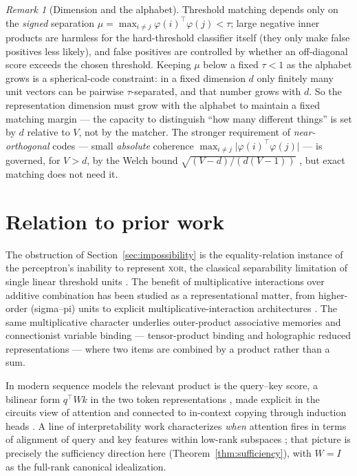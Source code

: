 \documentclass[11pt]{article}
\theoremstyle{plain}
\theoremstyle{definition}
\theoremstyle{remark}
\newtheorem{remark}{Remark}
\begin{document}
\begin{remark}[Dimension and the alphabet]
\label{rem:welch}
Threshold matching depends only on the \emph{signed} separation $\mu = \max_{i \neq j} \varphi(i)^{\top}\varphi(j) < \tau$; large negative inner products are harmless for the hard-threshold classifier itself (they only make false positives less likely), and false positives are controlled by whether an off-diagonal score exceeds the chosen threshold. Keeping $\mu$ below a fixed $\tau < 1$ as the alphabet grows is a spherical-code constraint: in a fixed dimension $d$ only finitely many unit vectors can be pairwise $\tau$-separated, and that number grows with $d$. So the representation dimension must grow with the alphabet to maintain a fixed matching margin --- the capacity to distinguish ``how many different things'' is set by $d$ relative to $V$, not by the matcher. The stronger requirement of \emph{near-orthogonal} codes --- small \emph{absolute} coherence $\max_{i \neq j} \lvert \varphi(i)^{\top}\varphi(j)\rvert$ --- is governed, for $V > d$, by the Welch bound $\sqrt{(V-d)/(d(V-1))}$ \cite{welch1974}, but exact matching does not need it.
\end{remark}

\section{Relation to prior work}
\label{sec:related}

The obstruction of Section~\ref{sec:impossibility} is the equality-relation instance of the perceptron's inability to represent \textsc{xor}, the classical separability limitation of single linear threshold units \cite{minsky1969}. The benefit of multiplicative interactions over additive combination has been studied as a representational matter, from higher-order (sigma--pi) units to explicit multiplicative-interaction architectures \cite{jayakumar2020}. The same multiplicative character underlies outer-product associative memories and connectionist variable binding --- tensor-product binding \cite{smolensky1990} and holographic reduced representations \cite{plate1995} --- where two items are combined by a product rather than a sum.

In modern sequence models the relevant product is the query--key score, a bilinear form $q^{\top} W k$ in the two token representations \cite{vaswani2017}, made explicit in the circuits view of attention \cite{elhage2021} and connected to in-context copying through induction heads \cite{olsson2022}. A line of interpretability work characterizes \emph{when} attention fires in terms of alignment of query and key features within low-rank subspaces \cite{lee2024qk, vit2024qk}; that picture is precisely the sufficiency direction here (Theorem~\ref{thm:sufficiency}), with $W = I$ as the full-rank canonical idealization.
\end{document}
